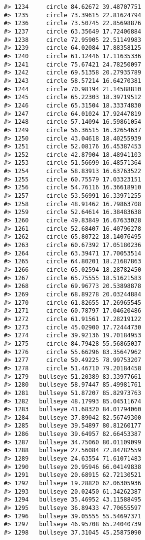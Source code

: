 \documentclass[
]{book}
\theoremstyle{definition}
\theoremstyle{definition}
\theoremstyle{definition}
\theoremstyle{definition}
\theoremstyle{remark}
\begin{document}
\begin{verbatim}
#> 1234     circle 84.62672 39.48707751
#> 1235     circle 73.39615 22.81624794
#> 1236     circle 73.50745 22.85698876
#> 1237     circle 63.35649 17.72406884
#> 1238     circle 72.95905 22.51149983
#> 1239     circle 64.02084 17.88358125
#> 1240     circle 61.12446 17.11635336
#> 1241     circle 75.67421 24.78250097
#> 1242     circle 69.51358 20.27935789
#> 1243     circle 58.57214 16.64270381
#> 1244     circle 70.98194 21.14588810
#> 1245     circle 65.22303 18.39719512
#> 1246     circle 65.31504 18.33374830
#> 1247     circle 64.01024 17.92447819
#> 1248     circle 57.14094 16.59861054
#> 1249     circle 56.36515 16.32654637
#> 1250     circle 43.04618 18.40255939
#> 1251     circle 52.08176 16.45387453
#> 1252     circle 42.87904 18.48941103
#> 1253     circle 51.56699 16.48571364
#> 1254     circle 58.83913 16.63763522
#> 1255     circle 60.75579 17.03323151
#> 1256     circle 54.76116 16.36618910
#> 1257     circle 53.56991 16.33971255
#> 1258     circle 48.91462 16.79863708
#> 1259     circle 52.64614 16.38483638
#> 1260     circle 49.83849 16.67633028
#> 1261     circle 52.68407 16.40796278
#> 1262     circle 65.80722 18.14076495
#> 1263     circle 60.67392 17.05180236
#> 1264     circle 63.39471 17.70053514
#> 1265     circle 64.80201 18.21687863
#> 1266     circle 65.02594 18.28782450
#> 1267     circle 65.75555 18.51621583
#> 1268     circle 69.96773 20.53898878
#> 1269     circle 68.89278 20.03244884
#> 1270     circle 61.82655 17.26965545
#> 1271     circle 60.78797 17.04620486
#> 1272     circle 61.91561 17.28219122
#> 1273     circle 45.02900 17.72444730
#> 1274     circle 39.92136 19.70184953
#> 1275     circle 84.79428 55.56865037
#> 1276     circle 55.66296 83.35647962
#> 1277     circle 50.49225 78.99753207
#> 1278     circle 51.46710 79.20184458
#> 1279   bullseye 51.20389 83.33977661
#> 1280   bullseye 58.97447 85.49981761
#> 1281   bullseye 51.87207 85.82973763
#> 1282   bullseye 48.17993 85.04511674
#> 1283   bullseye 41.68320 84.01794060
#> 1284   bullseye 37.89042 82.56749300
#> 1285   bullseye 39.54897 80.81260177
#> 1286   bullseye 39.64957 82.66453387
#> 1287   bullseye 34.75060 80.01109099
#> 1288   bullseye 27.56084 72.84782559
#> 1289   bullseye 24.63554 71.61071483
#> 1290   bullseye 20.95946 66.04149838
#> 1291   bullseye 20.68915 62.72130521
#> 1292   bullseye 19.28820 62.06305936
#> 1293   bullseye 20.02450 61.34262387
#> 1294   bullseye 35.46952 43.11588495
#> 1295   bullseye 36.89433 47.70655597
#> 1296   bullseye 39.05555 55.54697371
#> 1297   bullseye 46.95708 65.24040739
#> 1298   bullseye 37.31045 45.25875090

\end{verbatim}
\end{document}
